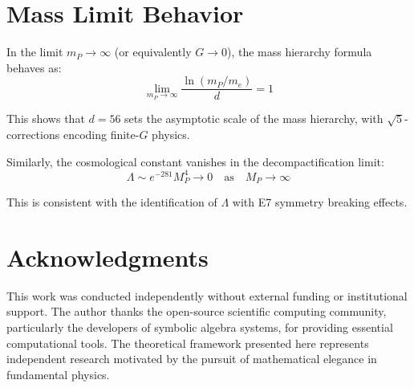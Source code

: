\documentclass[11pt,a4paper]{article}
\begin{document}
\section{Mass Limit Behavior}

In the limit $m_P \to \infty$ (or equivalently $G \to 0$), the mass hierarchy formula behaves as:
\begin{equation}
\lim_{m_P \to \infty} \frac{\ln(m_P/m_e)}{d} = 1
\end{equation}

This shows that $d = 56$ sets the asymptotic scale of the mass hierarchy, with $\sqrt{5}$-corrections encoding finite-$G$ physics.

Similarly, the cosmological constant vanishes in the decompactification limit:
\begin{equation}
\Lambda \sim e^{-281} M_P^4 \to 0 \quad \text{as} \quad M_P \to \infty
\end{equation}

This is consistent with the identification of $\Lambda$ with E7 symmetry breaking effects.

\section*{Acknowledgments}

This work was conducted independently without external funding or institutional support. The author thanks the open-source scientific computing community, particularly the developers of symbolic algebra systems, for providing essential computational tools. The theoretical framework presented here represents independent research motivated by the pursuit of mathematical elegance in fundamental physics.
\end{document}
